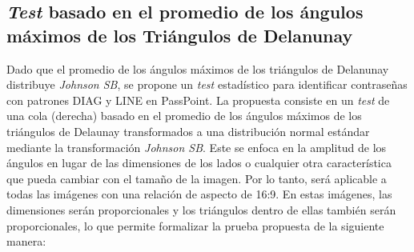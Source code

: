 \documentclass[12pt]{report}
\begin{document}
\subsection{\textit{Test} basado en el promedio de los ángulos máximos de los Triángulos de Delanunay}
Dado  que el promedio de los ángulos máximos de los triángulos de Delanunay distribuye \textit{Johnson SB}, se propone un  \textit{test} estadístico para identificar contraseñas con patrones DIAG y LINE en PassPoint. La propuesta consiste en un \textit{test} de una cola (derecha) basado en el promedio de los ángulos máximos de los triángulos de Delaunay transformados a una distribución normal estándar mediante la transformación \textit{Johnson SB}.
Este se enfoca en la amplitud de los ángulos en lugar de las dimensiones de los lados o cualquier otra característica que pueda cambiar con el tamaño de la imagen. Por lo tanto, será aplicable a todas las imágenes con una relación de aspecto de 16:9. En estas imágenes, las dimensiones serán proporcionales y los triángulos dentro de ellas también serán proporcionales, lo que permite formalizar la prueba propuesta de la siguiente manera:
\end{document}
